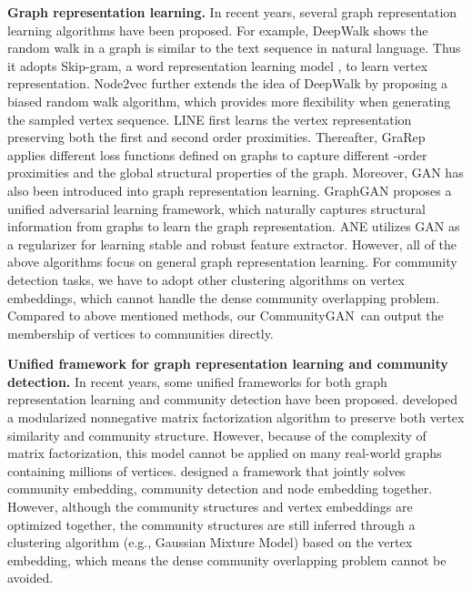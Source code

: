 \documentclass[sigconf]{acmart}
\newcommand{\ComGAN}{CommunityGAN}
\begin{document}
\vspace{5pt}\noindent \textbf{Graph representation learning.}
In recent years, several graph representation learning algorithms have been proposed.
For example, DeepWalk \cite{deepwalk} shows the random walk in a graph is similar to the text sequence in natural language. Thus it adopts Skip-gram, a word representation learning model \cite{word2vec}, to learn vertex representation.
Node2vec \cite{node2vec} further extends the idea of DeepWalk by proposing a biased random walk algorithm, which provides more flexibility when generating the sampled vertex sequence.
LINE \cite{LINE} first learns the vertex representation preserving both the first and second order proximities.
Thereafter, GraRep \cite{GraRep} applies different loss functions defined on graphs to capture different -order proximities and the global structural properties of the graph.
Moreover, GAN has also been introduced into graph representation learning.
GraphGAN \cite{GraphGAN} proposes a unified adversarial learning framework, which naturally captures structural information from graphs to learn the graph representation.
ANE \cite{ANE} utilizes GAN as a regularizer for learning stable and robust feature extractor.
However, all of the above algorithms focus on general graph representation learning.
For community detection tasks, we have to adopt other clustering algorithms on vertex embeddings, which cannot handle the dense community overlapping problem.
Compared to above mentioned methods, our \ComGAN~can output the membership of vertices to communities directly.

\vspace{5pt}\noindent \textbf{Unified framework for graph representation learning and community detection.}
In recent years, some unified frameworks for both graph representation learning and community detection have been proposed.
\citet{M-NMF} developed a modularized nonnegative matrix factorization algorithm to preserve both vertex similarity and community structure.
However, because of the complexity of matrix factorization, this model cannot be applied on many real-world graphs containing millions of vertices.
\citet{ComE} designed a framework that jointly solves community embedding, community detection and node embedding together.
However, although the community structures and vertex embeddings are optimized together, the community structures are still inferred through a clustering algorithm (e.g., Gaussian Mixture Model) based on the vertex embedding, which means the dense community overlapping problem cannot be avoided.
\end{document}
